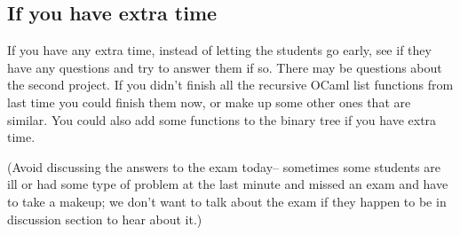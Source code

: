 \documentclass[12pt]{article}
\begin{document}
    \subsection{If you have extra time}
  
      If you have any extra time, instead of letting the students go early,
    see if they have any questions and try to answer them if so.  There may
    be questions about the second project.  If you didn't finish all the
    recursive OCaml list functions from last time you could finish them now,
    or make up some other ones that are similar.  You could also add some
    functions to the binary tree if you have extra time.

      (Avoid discussing the answers to the exam today-- sometimes some students
    are ill or had some type of problem at the last minute and missed an
    exam and have to take a makeup; we don't want to talk about the exam if
    they happen to be in discussion section to hear about it.)
\end{document}
